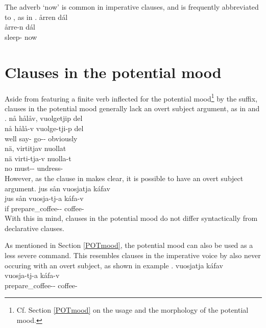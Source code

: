 The adverb  ‘now’ is common in imperative clauses, and is frequently abbreviated to , as in .
\ea\label{impClause5}
\glll	årren dál\\
	årre-n dál\\
	sleep- now\\\nopagebreak
{} 
\z


\section{Clauses in the potential mood}\label{potClauses}
Aside from featuring a finite verb inflected for the potential mood\footnote{Cf. Section \ref{POTmood} on the usage and the morphology of the potential mood.} by the  suffix, clauses in the potential mood generally lack an overt subject argument, as in %
 and . 
\ea\label{potSyntaxEx2}
\glll	nå hålåv, vuolgetjip del\\
	nå hålå-v vuolge-tji-p del\\
	well say- go-- obviously\\\nopagebreak
{}	
\z
\ea\label{potSyntaxEx3}
\glll	nä, virtitjav nuollat\\
	nä virti-tja-v nuolla-t\\
	no must-- undress-\\\nopagebreak
{}	
\z
However, as the clause in  makes clear, it is possible to have an overt subject argument. 
\ea\label{potSyntaxEx1}
\glll	jus sån vuosjatja káfav\\
	jus sån vuosja-tj-a káfa-v\\
	if  prepare\_coffee-- coffee-\\\nopagebreak
{}	
\z
With this in mind, clauses in the potential mood do not differ syntactically from declarative clauses. %

As mentioned in Section \ref{POTmood}, the potential mood can also be used as a less severe command. This resembles clauses in the imperative voice by also never occuring with an overt subject, as shown %
in example . 
\ea\label{potSyntaxEx4}%
\glll	vuosjatja káfav\\
	vuosja-tj-a káfa-v\\
	prepare\_coffee-- coffee-\\\nopagebreak
{}	
\z

